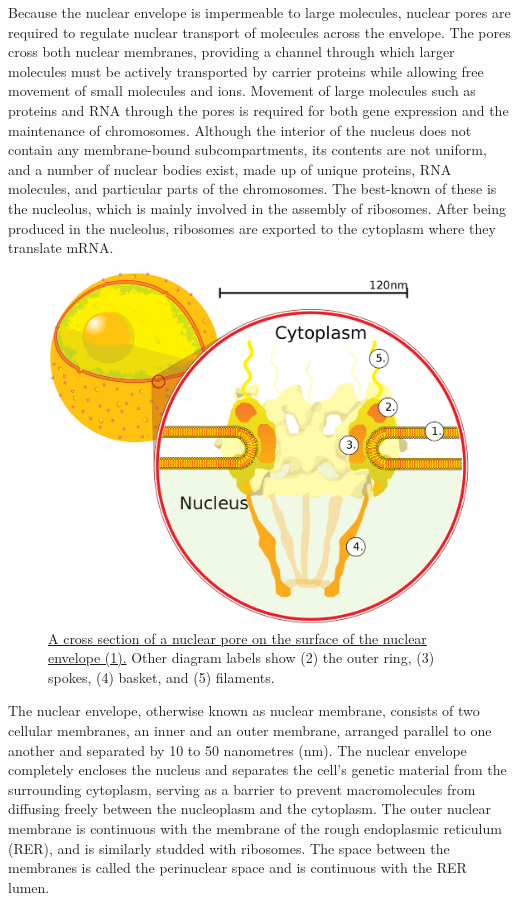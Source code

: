 Because the nuclear envelope is impermeable to large molecules, nuclear pores are required to regulate nuclear transport of molecules across the envelope. The pores cross both nuclear membranes, providing a channel through which larger molecules must be actively transported by carrier proteins while allowing free movement of small molecules and ions. Movement of large molecules such as proteins and RNA through the pores is required for both gene expression and the maintenance of chromosomes. Although the interior of the nucleus does not contain any membrane-bound subcompartments, its contents are not uniform, and a number of nuclear bodies exist, made up of unique proteins, RNA molecules, and particular parts of the chromosomes. The best-known of these is the nucleolus, which is mainly involved in the assembly of ribosomes. After being produced in the nucleolus, ribosomes are exported to the cytoplasm where they translate mRNA.



\begin{figure}

{\centering \includegraphics[width=0.7\linewidth]{./figures/cells/NuclearPore_crop} 

}

\caption{\href{https://en.wikipedia.org/wiki/Cell_nucleus\#/media/File:NuclearPore_crop.svg}{A cross section of a nuclear pore on the surface of the nuclear envelope (1).} Other diagram labels show (2) the outer ring, (3) spokes, (4) basket, and (5) filaments.}\label{fig:nuclearpore}
\end{figure}

The nuclear envelope, otherwise known as nuclear membrane, consists of two cellular membranes, an inner and an outer membrane, arranged parallel to one another and separated by 10 to 50 nanometres (nm). The nuclear envelope completely encloses the nucleus and separates the cell's genetic material from the surrounding cytoplasm, serving as a barrier to prevent macromolecules from diffusing freely between the nucleoplasm and the cytoplasm. The outer nuclear membrane is continuous with the membrane of the rough endoplasmic reticulum (RER), and is similarly studded with ribosomes. The space between the membranes is called the perinuclear space and is continuous with the RER lumen.

